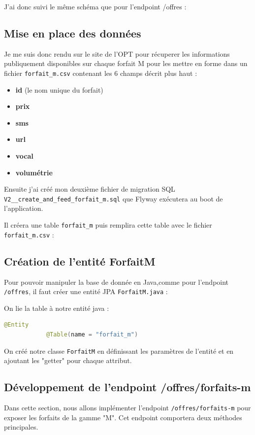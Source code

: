 \documentclass[11pt]{article}
\begin{document}
		J'ai donc suivi le même schéma que pour l'endpoint /offres :
		
		\subsection*{Mise en place des données}
		\label{subsec:mpd}
		Je me suis donc rendu sur le site de l'OPT pour récuperer les informations publiquement disponibles sur chaque forfait M pour les mettre en forme dans un fichier \texttt{forfait\_m.csv}
		contenant les 6 champs décrit plus haut : 
		\begin{itemize} 
			\item \textbf{id} (le nom unique du forfait)
			\item \textbf{prix}
			\item \textbf{sms}
			\item \textbf{url}
			\item \textbf{vocal}
			\item \textbf{volumétrie}
		\end{itemize}
		
		Ensuite j'ai créé mon deuxième fichier de migration SQL \texttt{V2\_\_create\_and\_feed\_forfait\_m.sql} que Flyway exécutera au boot de l'application. 
		
		Il créera une table \texttt{forfait\_m} puis remplira cette table avec le fichier \texttt{forfait\_m.csv} : 
		\subsection*{Création de l'entité ForfaitM}
		\label{subsec:JPA}
		Pour pouvoir manipuler la base de donnée en Java,comme pour l'endpoint \texttt{/offres}, il faut créer une entité JPA \texttt{ForfaitM.java} :
		
		On lie la table à notre entité java :
		\begin{lstlisting}[language=java]
			@Entity
			@Table(name = "forfait_m") 
		\end{lstlisting}
		
		On créé notre classe \texttt{ForfaitM} en définissant les paramètres de l'entité et en ajoutant les "getter" pour chaque attribut.
			
		\subsection*{Développement de l'endpoint /offres/forfaits-m}
		\label{subsec:endpoint-m}
		Dans cette section, nous allons implémenter l'endpoint \texttt{/offres/forfaits-m} pour exposer les forfaits de la gamme "M". Cet endpoint comportera deux méthodes principales.
		
\end{document}
